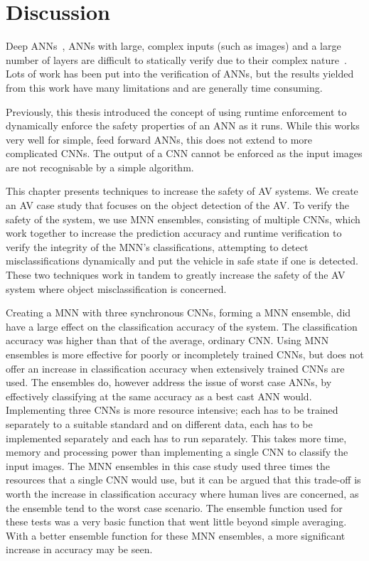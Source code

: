 \section{Discussion}
Deep \acfp{ANN}~\cite{schmidhuber2015deep}, \acp{ANN} with large, complex inputs (such as images) and a large number of layers are difficult to statically verify due to their complex nature~\cite{Gehr2018AI2SA}. 
Lots of work has been put into the verification of \acp{ANN}, but the results yielded from this work have many limitations and are generally time consuming.

Previously, this thesis introduced the concept of using runtime enforcement to dynamically enforce the safety properties of an \ac{ANN} as it runs. 
While this works very well for simple, feed forward \acp{ANN}, this does not extend to more complicated \acp{CNN}.
The output of a \ac{CNN} cannot be enforced as the input images are not recognisable by a simple algorithm.

This chapter presents techniques to increase the safety of \ac{AV} systems. 
We create an \acf{AV} case study that focuses on the object detection of the \ac{AV}. 
To verify the safety of the system, we use \ac{MNN} ensembles, consisting of multiple \acp{CNN}, which work together to increase the prediction accuracy and runtime verification to verify the integrity of the \ac{MNN}'s classifications, attempting to detect misclassifications dynamically and put the vehicle in safe state if one is detected.
These two techniques work in tandem to greatly increase the safety of the \ac{AV} system where object misclassification is concerned.

Creating a \ac{MNN}  with three synchronous \acp{CNN}, forming a \ac{MNN} ensemble, did have a large effect on the classification accuracy of the system.
The classification accuracy was higher than that of the average, ordinary \ac{CNN}.
Using \ac{MNN} ensembles is more effective for poorly or incompletely trained \acp{CNN}, but does not offer an increase in classification accuracy when extensively trained \acp{CNN} are used.
The ensembles do, however address the issue of worst case \acp{ANN}, by effectively classifying at the same accuracy as a best cast \ac{ANN} would.
Implementing three \acp{CNN} is more resource intensive; each has to be trained separately to a suitable standard and on different data, each has to be implemented separately and each has to run separately.
This takes more time, memory and processing power than implementing a single \ac{CNN} to classify the input images.
The \ac{MNN} ensembles in this case study used three times the resources that a single \ac{CNN} would use, but it can be argued that this trade-off is worth the increase in classification accuracy where human lives are concerned, as the ensemble tend to the worst case scenario.
The ensemble function used for these tests was a very basic function that went little beyond simple averaging.
With a better ensemble function for these \ac{MNN} ensembles, a more significant increase in accuracy may be seen.

